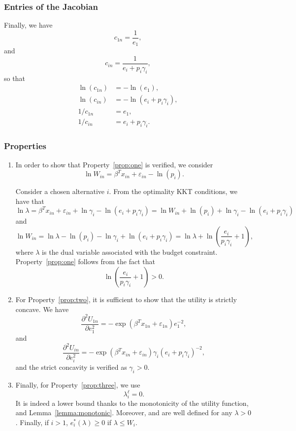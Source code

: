 \documentclass[12pt,a4paper]{article}
\begin{document}
\subsubsection*{Entries of the Jacobian}
Finally, we have
\[
c_{1n} = \frac{1}{e_1},
\]
and
\[
c_{in} = \frac{1}{e_i + p_i \gamma_i},
\]
so that
\begin{align*}
    \ln(c_{1n}) &= -\ln(e_1), \\
    \ln(c_{in}) &= -\ln(e_i + p_i \gamma_i), \\
    1/c_{1n} &= e_1, \\
    1/c_{in} &= e_i + p_i \gamma_i.
\end{align*}

\subsubsection*{Properties}

\begin{enumerate}
\item In order to show that Property~\ref{prop:one} is verified, we consider
\[
    \ln W_{in}  =\beta^T x_{in} + \varepsilon_{in} -\ln(p_i).
\]


Consider a chosen alternative $i$. From the optimality KKT conditions, we have that
\[
   \ln \lambda =\beta^T x_{in}+ \varepsilon_{in} + \ln \gamma_i - \ln(e_i + p_i \gamma_i) = \ln W_{in}+\ln(p_i) +\ln \gamma_i - \ln(e_i + p_i \gamma_i)
\]
and
\[
    \ln W_{in} =\ln \lambda  -\ln(p_i) -\ln \gamma_i + \ln(e_i + p_i \gamma_i) = \ln \lambda + \ln\left(\frac{e_i}{p_i\gamma_i}+1\right),
\]
where $\lambda$ is the dual variable associated with the budget constraint.
Property~\ref{prop:one} follows from the fact that
\[
     \ln\left(\frac{e_i}{p_i\gamma_i}+1\right)> 0.
\]
\item For Property~\ref{prop:two}, it is sufficient to show that the utility is strictly concave.
We have
\[
    \frac{\partial^2 U_{1n}}{\partial e_1^2} = -\exp(\beta^T x_{1n} + \varepsilon_{1n}) e_1^{-2},
\]
and
\[
    \frac{\partial^2 U_{in}}{\partial e_i^2} = -\exp(\beta^T x_{in} + \varepsilon_{in}) \gamma_i(e_i + p_i \gamma_i)^{-2},
\]
and the strict concavity is verified as $\gamma_i > 0$.
\item Finally, for Property~\ref{prop:three}, we use \[
              \lambda^\ell_i = 0.
\]
 It is indeed a lower bound thanks to the monotonicity
of the utility function, and Lemma~\ref{lemma:monotonic}. Moreover,  and
 are well defined for any $\lambda > 0$. Finally,
    if $i>1$, $e_i^*(\lambda) \geq 0$ if $\lambda \leq W_i$.
\end{enumerate}
\end{document}
